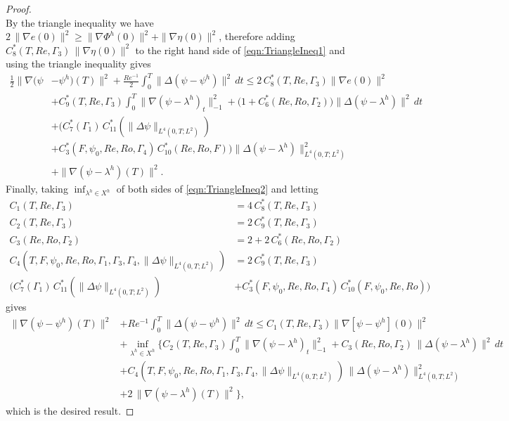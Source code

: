 \begin{proof}
\begin{equation}
  \end{equation}
  By the triangle inequality we have $2\, \|\nabla e(0)\|^2 \ge \|\nabla
  \Phi^h(0)\|^2 + \|\nabla \eta(0)\|^2$, therefore adding
  $C_8^*(T,Re,\Gamma_3)\,\|\nabla \eta(0)\|^2$ to the right hand side of
  \eqref{eqn:TriangleIneq1} and using the triangle inequality gives
  \begin{equation}
    \begin{split}
      \frac{1}{2} \|\nabla \biggl( \psi &- \psi^h\biggr)(T) \|^2
      + \frac{Re^{-1}}{2} \int_0^T\! \|\Delta \left(\psi - \psi^h\right)\|^2\, dt
        \le 2\,C^*_8(T,Re,\Gamma_3) \|\nabla e(0)\|^2 \\
      & + C^*_9(T,Re,\Gamma_3) \int_0^T\! \|\nabla \left( \psi - \lambda^h\right)_t\|_{-1}^2
        + \bigl(1 + C^*_6(Re,Ro,\Gamma_2)\bigr)
        \|\Delta \left(\psi - \lambda^h\right)\|^2\, dt \\
      & + \bigl(C^*_7(\Gamma_1)\, C^*_{11}(\|\Delta \psi \|_{L^4(0,T;L^2)}) \\
      & + C^*_3(F,\psi_0,Re,Ro,\Gamma_4)\,C^*_{10}(Re,Ro,F)\bigr)
        \|\Delta \left(\psi - \lambda^h\right)\|^2_{L^4(0,T;L^2)} \\
      & + \|\nabla \left(\psi - \lambda^h\right)(T)\|^2.
    \end{split}
    \label{eqn:TriangleIneq2}
  \end{equation}
  Finally, taking $\inf_{\lambda^h \in X^h}$ of both sides of
  \eqref{eqn:TriangleIneq2} and letting
  \begin{align*}
    C_1(T,Re,\Gamma_3) &= 4\, C^*_8(T,Re,\Gamma_3) \\
    C_2(T,Re,\Gamma_3) &= 2\, C^*_9(T,Re,\Gamma_3) \\
    C_3(Re,Ro,\Gamma_2) &= 2 + 2\,C^*_6(Re,Ro,\Gamma_2) \\
    C_4(T,F,\psi_0,Re,Ro,\Gamma_1,\Gamma_3,\Gamma_4,
      \|\Delta \psi\|_{L^4(0,T;L^2)}) &= 2\, C^*_9(T,Re,\Gamma_3) \\
      \biggl(C^*_7(\Gamma_1)\, C^*_{11}(\|\Delta \psi\|_{L^4(0,T;L^2)})
      &+ C^*_3(F,\psi_0,Re,Ro,\Gamma_4)\, C^*_{10}(F,\psi_0,Re,Ro)\biggr)
  \end{align*}
  gives
  \begin{align*}
    \|\nabla \left( \psi - \psi^h\right)(T) \|^2
      &+ Re^{-1} \int_0^T\! \|\Delta \left(\psi - \psi^h\right)\|^2\, dt
      \le C_1(T,Re,\Gamma_3)\biggl\|\nabla\left[\psi - \psi^h\right](0)\biggr\|^2 \\
    & + \inf_{\lambda^h \in X^h} \biggl\{C_2(T,Re,\Gamma_3)
      \int_0^T\! \biggl\|\nabla \left( \psi - \lambda^h\right)_t\biggr\|_{-1}^2
      + C_3(Re,Ro,\Gamma_2)\,\biggl\|\Delta \left(\psi -
      \lambda^h\right)\biggr\|^2\, dt \\
    & + C_4(T,F,\psi_0,Re,Ro,\Gamma_1,\Gamma_3,\Gamma_4,\|\Delta
      \psi\|_{L^4(0,T;L^2)})\, \biggl\|\Delta \left(\psi -
      \lambda^h\right)\biggr\|^2_{L^4(0,T;L^2)} \\
    & + 2\, \|\nabla \left(\psi - \lambda^h\right)(T)\|^2\biggr\},
  \end{align*}
  which is the desired result.
\end{proof}

